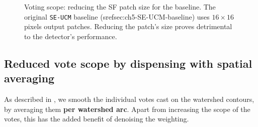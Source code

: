\begin{figure}[t]
\centering
\caption[Voting scope: reducing the SF patch size - plots]{Voting scope: reducing the SF patch size for the baseline. The original {\tt SE-UCM} baseline (sref{sec:ch5-SE-UCM-baseline}) uses $16\times16$ pixels output patches. Reducing the patch's size proves detrimental to %
the detector's performance.}
\label{fig:degraded-baseline}
\end{figure}

\subsection{Reduced vote scope by dispensing with spatial averaging}
As described in , we smooth %
the individual votes cast on the watershed contours, by averaging them {\bf per watershed arc}. Apart from increasing the scope of the votes, this has the added benefit of denoising the weighting. 


